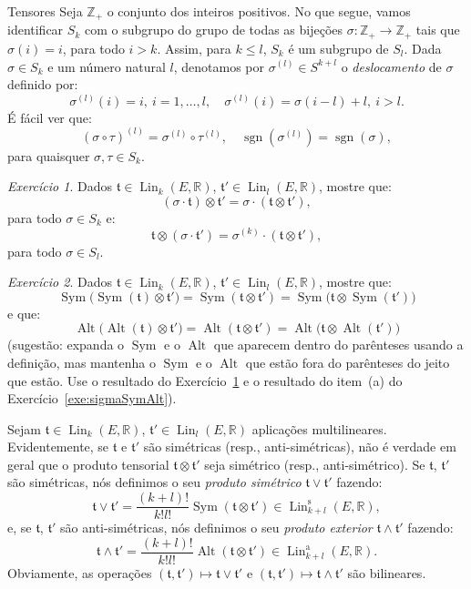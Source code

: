 \documentclass[oneside,11pt]{amsart}
\newcommand{\R}{\mathds R}
\newcommand{\Z}{\mathds Z}
\DeclareMathOperator{\Lin}{Lin}
\DeclareMathOperator{\sgn}{sgn}
\DeclareMathOperator{\Sym}{Sym}
\DeclareMathOperator{\Alt}{Alt}
\theoremstyle{remark}\newtheorem{exercise}{Exercício}[section]
\theoremstyle{plain}\newtheorem{teo}{Teorema}[section]
\theoremstyle{plain}\newtheorem{lem}[teo]{Lema}
\theoremstyle{plain}\newtheorem{prop}[teo]{Proposição}
\theoremstyle{definition}\newtheorem{defin}[teo]{Definição}
\theoremstyle{remark}\newtheorem{rem}[teo]{Observação}
\theoremstyle{definition}\newtheorem{example}[teo]{Exemplo}
\numberwithin{equation}{section}
\begin{document}
\begin{section}{Tensores}
Seja $\Z_+$ o conjunto dos inteiros positivos. No que segue, vamos identificar $S_k$ com o subgrupo do grupo de todas as bijeções $\sigma:\Z_+\to\Z_+$
tais que $\sigma(i)=i$, para todo $i>k$. Assim, para $k\le l$, $S_k$ é um subgrupo de $S_l$. Dada $\sigma\in S_k$ e um número natural $l$, denotamos por
$\sigma^{(l)}\in S^{k+l}$ o {\em deslocamento\/} de $\sigma$ definido por:
\begin{equation}\label{eq:defdeslocamento}
\sigma^{(l)}(i)=i,\ i=1,\ldots,l,\quad\sigma^{(l)}(i)=\sigma(i-l)+l,\ i>l.
\end{equation}
É fácil ver que:
\[(\sigma\circ\tau)^{(l)}=\sigma^{(l)}\circ\tau^{(l)},\quad\sgn(\sigma^{(l)})=\sgn(\sigma),\]
para quaisquer $\sigma,\tau\in S_k$.

\begin{exercise}\label{exe:sigmatensor}
Dados $\mathfrak t\in\Lin_k(E,\R)$, $\mathfrak t'\in\Lin_l(E,\R)$, mostre que:
\[(\sigma\cdot\mathfrak t)\otimes\mathfrak t'=\sigma\cdot(\mathfrak t\otimes\mathfrak t'),\]
para todo $\sigma\in S_k$ e:
\[\mathfrak t\otimes(\sigma\cdot\mathfrak t')=\sigma^{(k)}\cdot(\mathfrak t\otimes\mathfrak t'),\]
para todo $\sigma\in S_l$.
\end{exercise}

\begin{exercise}\label{exe:SymSymAltAlt}
Dados $\mathfrak t\in\Lin_k(E,\R)$, $\mathfrak t'\in\Lin_l(E,\R)$, mostre que:
\[\Sym\!\big(\!\Sym(\mathfrak t)\otimes\mathfrak t'\big)=\Sym(\mathfrak t\otimes\mathfrak t')=\Sym\!\big(\mathfrak t\otimes\Sym(\mathfrak t')\big)\]
e que:
\[\Alt\!\big(\!\Alt(\mathfrak t)\otimes\mathfrak t'\big)=\Alt(\mathfrak t\otimes\mathfrak t')=\Alt\!\big(\mathfrak t\otimes\Alt(\mathfrak t')\big)\]
(sugestão: expanda o $\Sym$ e o $\Alt$ que aparecem dentro do parênteses usando a definição, mas mantenha o $\Sym$ e o $\Alt$ que estão fora do parênteses
do jeito que estão. Use o resultado do Exercício~\ref{exe:sigmatensor} e o resultado do item~(a) do Exercício~\ref{exe:sigmaSymAlt}).
\end{exercise}

Sejam $\mathfrak t\in\Lin_k(E,\R)$, $\mathfrak t'\in\Lin_l(E,\R)$ aplicações multilineares. Evidentemente, se $\mathfrak t$ e $\mathfrak t'$ são
simétricas (resp., anti-simétricas), não é verdade em geral que o produto tensorial $\mathfrak t\otimes\mathfrak t'$ seja simétrico (resp., anti-simétrico).
Se $\mathfrak t$, $\mathfrak t'$ são simétricas, nós definimos o seu {\em produto simétrico\/} $\mathfrak t\vee\mathfrak t'$ fazendo:
\[\mathfrak t\vee\mathfrak t'=\frac{(k+l)!}{k!l!}\Sym(\mathfrak t\otimes\mathfrak t')\in\Lin_{k+l}^{\mathrm s}(E,\R),\]
e, se $\mathfrak t$, $\mathfrak t'$ são anti-simétricas, nós definimos o seu {\em produto exterior\/} $\mathfrak t\wedge\mathfrak t'$ fazendo:
\[\mathfrak t\wedge\mathfrak t'=\frac{(k+l)!}{k!l!}\Alt(\mathfrak t\otimes\mathfrak t')\in\Lin_{k+l}^{\mathrm a}(E,\R).\]
Obviamente, as operações $(\mathfrak t,\mathfrak t')\mapsto\mathfrak t\vee\mathfrak t'$ e $(\mathfrak t,\mathfrak t')\mapsto\mathfrak t\wedge\mathfrak t'$
são bilineares.


\end{section}
\end{document}
